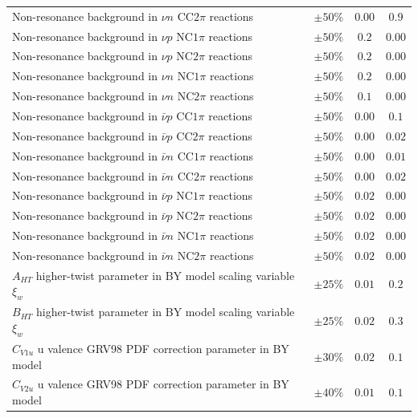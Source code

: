 \begin{longtable}{p{3.25in} c c c}
  Non-resonance background in $\nu n$ CC$2\pi$ reactions & $\pm50\%$ & $0.00$ & $0.9$ \\
  Non-resonance background in $\nu p$ NC$1\pi$ reactions & $\pm50\%$ & $0.2$ & $0.00$ \\
  Non-resonance background in $\nu p$ NC$2\pi$ reactions & $\pm50\%$ & $0.2$ & $0.00$ \\
  Non-resonance background in $\nu n$ NC$1\pi$ reactions & $\pm50\%$ & $0.2$ & $0.00$ \\
  Non-resonance background in $\nu n$ NC$2\pi$ reactions & $\pm50\%$ & $0.1$ & $0.00$ \\
  Non-resonance background in $\bar{\nu} p$ CC$1\pi$ reactions & $\pm50\%$ & $0.00$ & $0.1$ \\
  Non-resonance background in $\bar{\nu} p$ CC$2\pi$ reactions & $\pm50\%$ & $0.00$ & $0.02$ \\
  Non-resonance background in $\bar{\nu} n$ CC$1\pi$ reactions & $\pm50\%$ & $0.00$ & $0.01$ \\
  Non-resonance background in $\bar{\nu} n$ CC$2\pi$ reactions & $\pm50\%$ & $0.00$ & $0.02$ \\
  Non-resonance background in $\bar{\nu} p$ NC$1\pi$ reactions & $\pm50\%$ & $0.02$ & $0.00$ \\
  Non-resonance background in $\bar{\nu} p$ NC$2\pi$ reactions & $\pm50\%$ & $0.02$ & $0.00$ \\
  Non-resonance background in $\bar{\nu} n$ NC$1\pi$ reactions & $\pm50\%$ & $0.02$ & $0.00$ \\
  Non-resonance background in $\bar{\nu} n$ NC$2\pi$ reactions & $\pm50\%$ & $0.02$ & $0.00$ \\
  $A_{HT}$ higher-twist parameter in BY model scaling \newline variable $\xi_w$ & $\pm25\%$ & $0.01$ & $0.2$ \\
  $B_{HT}$ higher-twist parameter in BY model scaling \newline variable $\xi_w$ & $\pm25\%$ & $0.02$ & $0.3$ \\
  $C_{V1u}$ u valence GRV98 PDF correction parameter \newline in BY model & $\pm30\%$ & $0.02$ & $0.1$ \\
  $C_{V2u}$ u valence GRV98 PDF correction parameter \newline in BY model & $\pm40\%$ & $0.01$ & $0.1$ \\

\end{longtable}

